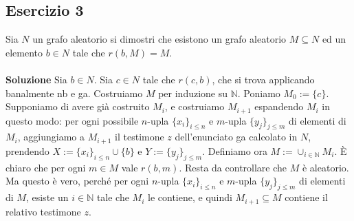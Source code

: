 \documentclass[10pt,a4paper]{article}
\def\ssf#1{\textsf{\small #1}}
\begin{document}
\subsection*{Esercizio 3}
Sia $N$ un grafo aleatorio si dimostri che esistono un grafo aleatorio $M\subseteq N$ ed un elemento $b\in N$ tale che $r(b,M)=M$.\\
\\
\noindent\textbf{Soluzione} Sia $b \in N$. Sia $c \in N$ tale che $r(c,b)$, che si trova applicando banalmente \ssf{nb} e \ssf{ga}. Costruiamo $M$ per induzione su $\mathbb{N}$. Poniamo $M_0:=\{c\}$. Supponiamo di avere già costruito $M_i$, e costruiamo $M_{i+1}$ espandendo $M_i$ in questo modo: per ogni possibile $n$-upla $\{x_i\}_{i \leq n}$ e $m$-upla $\{y_j\}_{j \leq m}$ di elementi di $M_i$, aggiungiamo a $M_{i+1}$ il testimone $z$ dell'enunciato \ssf{ga} calcolato in $N$, prendendo $X:=\{x_i\}_{i \leq n} \cup \{b\}$ e $Y:=\{y_j\}_{j \leq m}$. Definiamo ora $M:= \cup_{i \in \mathbb{N}} M_i$. È chiaro che per ogni $m \in M$ vale $r(b,m)$. Resta da controllare che $M$ è aleatorio. Ma questo è vero, perché per ogni $n$-upla $\{x_i\}_{i \leq n}$ e $m$-upla $\{y_j\}_{j \leq m}$ di elementi di $M$, esiste un $i \in \mathbb{N}$ tale che $M_i$ le contiene, e quindi $M_{i+1} \subseteq M$ contiene il relativo testimone $z$.

\end{document}
